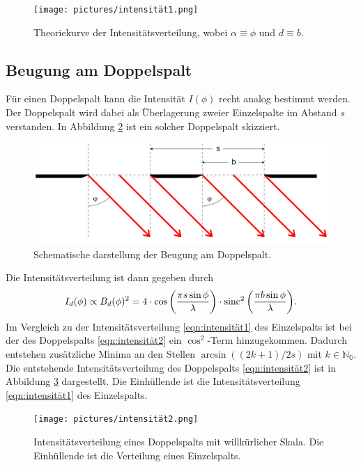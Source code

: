 \begin{figure}[H]
    \centering
    \texttt{[image: pictures/intensität1.png]}
    \caption{Theoriekurve der Intensitätsverteilung, wobei $\alpha\equiv\phi$ und $d\equiv b$. \cite{AP03}} %
    \label{fig:frauenhofer3}
\end{figure}

\subsection{Beugung am Doppelspalt}
\label{sec:doppel}
Für einen Doppelspalt kann die Intensität $I(\phi)$ recht analog bestimmt werden. Der Doppelspalt wird dabei als Überlagerung zweier Einzelspalte im
Abstand $s$ verstanden. In Abbildung \ref{fig:doppel} ist ein solcher Doppelspalt skizziert.
\begin{figure}[H]
    \centering
    \includegraphics[scale = 0.4]{pictures/doppel.png}
    \caption{Schematische darstellung der Beugung am Doppelspalt. \cite{AP01}}
    \label{fig:doppel}
\end{figure}

\noindent
Die Intensitätsverteilung ist dann gegeben durch
\begin{equation}
    I_d(\phi)\propto B_d(\phi)^2
    =4\cdot \cos{\left(\frac{\pi s\sin{\phi}}{\lambda}\right)}\cdot \operatorname{sinc}^2{\left(\frac{\pi b \sin{\phi}}{\lambda}\right)}  .
    \label{eqn:intensität2}
\end{equation}
Im Vergleich zu der Intensitätsverteilung \eqref{eqn:intensität1} des Einzelspalts ist bei der des Doppelspalts \eqref{eqn:intensität2} ein
$\cos^2$-Term hinzugekommen. Dadurch entstehen zusätzliche Minima an den Stellen $\arcsin{((2k+1)/2s)}$ mit $k\in\mathbb{N_0}$. Die entstehende
Intensitätsverteilung des Doppelspalts \eqref{eqn:intensität2} ist in Abbildung \ref{fig:intensität2} dargestellt. Die Einhüllende ist die Intensitätsverteilung
\ref{eqn:intensität1} des Einzelspalts.
\begin{figure}[H]
    \centering
    \texttt{[image: pictures/intensität2.png]}
    \caption{Intensitätsverteilung eines Doppelspalts mit willkürlicher Skala. Die Einhüllende ist die Verteilung eines Einzelspalts. \cite{AP04}}
    \label{fig:intensität2}
\end{figure}

